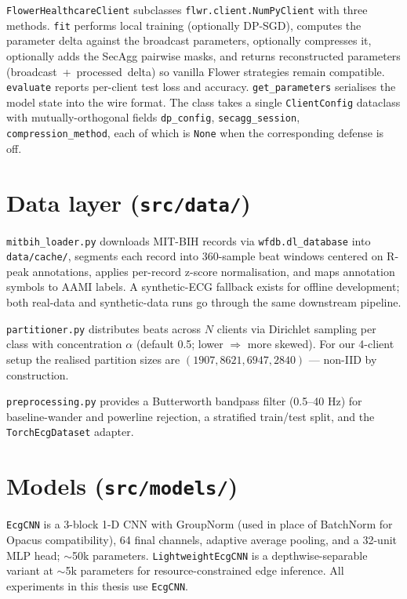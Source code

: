 \documentclass[11pt,a4paper]{report}
\begin{document}
\texttt{FlowerHealthcareClient} subclasses \texttt{flwr.client.NumPyClient}
with three methods. \texttt{fit} performs local training (optionally
DP-SGD), computes the parameter delta against the broadcast parameters,
optionally compresses it, optionally adds the SecAgg pairwise masks, and
returns reconstructed parameters (broadcast~+~processed~delta) so vanilla
Flower strategies remain compatible. \texttt{evaluate} reports per-client
test loss and accuracy. \texttt{get\_parameters} serialises the model state
into the wire format. The class takes a single \texttt{ClientConfig} dataclass
with mutually-orthogonal fields \texttt{dp\_config}, \texttt{secagg\_session},
\texttt{compression\_method}, each of which is \texttt{None} when the
corresponding defense is off.

\section{Data layer (\texttt{src/data/})}\label{sec:method-data}

\texttt{mitbih\_loader.py} downloads MIT-BIH records via
\texttt{wfdb.dl\_database} into \texttt{data/cache/}, segments each record
into 360-sample beat windows centered on R-peak annotations, applies
per-record z-score normalisation, and maps annotation symbols to AAMI labels.
A synthetic-ECG fallback exists for offline development; both real-data and
synthetic-data runs go through the same downstream pipeline.

\texttt{partitioner.py} distributes beats across $N$ clients via Dirichlet
sampling per class with concentration $\alpha$ (default 0.5; lower
$\Rightarrow$ more skewed). For our 4-client setup the realised partition
sizes are $(1907, 8621, 6947, 2840)$ --- non-IID by construction.

\texttt{preprocessing.py} provides a Butterworth bandpass filter (0.5--40
Hz) for baseline-wander and powerline rejection, a stratified train/test
split, and the \texttt{TorchEcgDataset} adapter.

\section{Models (\texttt{src/models/})}

\texttt{EcgCNN} is a 3-block 1-D CNN with GroupNorm
(used in place of BatchNorm for Opacus compatibility), 64 final channels,
adaptive average pooling, and a 32-unit MLP head; $\sim$50k parameters.
\texttt{LightweightEcgCNN} is a depthwise-separable variant at $\sim$5k
parameters for resource-constrained edge inference. All experiments in this
thesis use \texttt{EcgCNN}.
\end{document}
